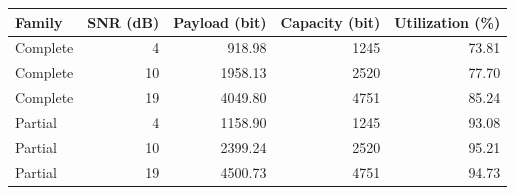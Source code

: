 \begin{tabular}{lrrrr}
\toprule
Family & SNR (dB) & Payload (bit) & Capacity (bit) & Utilization (\%) \\
\midrule
Complete & 4 & 918.98 & 1245 & 73.81 \\
Complete & 10 & 1958.13 & 2520 & 77.70 \\
Complete & 19 & 4049.80 & 4751 & 85.24 \\
Partial & 4 & 1158.90 & 1245 & 93.08 \\
Partial & 10 & 2399.24 & 2520 & 95.21 \\
Partial & 19 & 4500.73 & 4751 & 94.73 \\
\bottomrule
\end{tabular}
